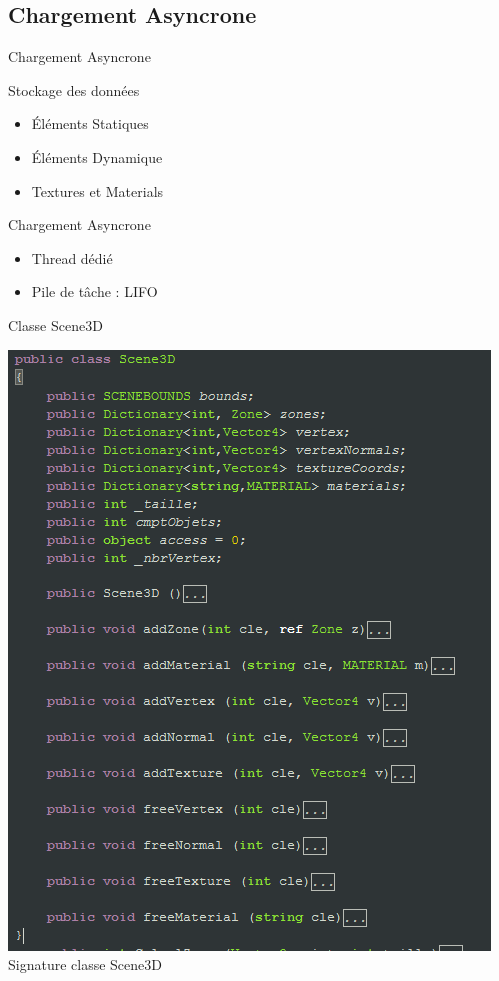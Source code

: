 \documentclass{beamer}
\begin{document}
		\subsection{Chargement Asyncrone}
			\begin{frame}{Chargement Asyncrone}
			\begin{block}{Stockage des données}
				\begin{itemize}
					\item{Éléments Statiques}
					\item{Éléments Dynamique}
					\item{Textures et Materials}
				\end{itemize}
			\end{block}
			\pause
			\begin{exampleblock}{Chargement Asyncrone}
				\begin{itemize}
					\item{Thread dédié}
					\item{Pile de tâche : LIFO}
				\end{itemize}
			\end{exampleblock}
			\pause
		\end{frame}
		\begin{frame}{Classe Scene3D}
			\begin{center}
				\includegraphics[scale=0.45]{images/extraitStockage.png} \\
				\tiny{Signature classe Scene3D\\} 
			\end{center}
		\end{frame}
\end{document}
